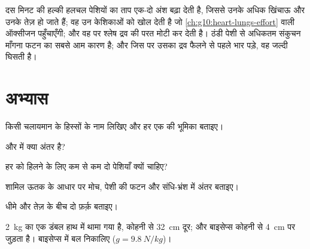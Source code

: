 \begin{remark}\label{rem:g10:muscles-and-joints:warmup}
दस मिनट की हल्की हलचल पेशियों का ताप एक-दो अंश बढ़ा देती है, जिससे उनके
 अधिक खिंचाऊ और उनके  तेज़ हो जाते हैं; वह उन केशिकाओं को
खोल देती है जो \cref{ch:g10:heart-lungs-effort} वाली ऑक्सीजन पहुँचाएँगी;
और वह  पर श्लेष द्रव की परत मोटी कर देती है। ठंडी पेशी से अधिकतम
संकुचन माँगना फटन का सबसे आम कारण है; और जिस  पर उसका द्रव फैलने से
पहले भार पड़े, वह जल्दी घिसती है।
\end{remark}

\section{अभ्यास}

\begin{exercise}[$\star$]\label{exo:g10:muscles-and-joints:1}
किसी चलायमान  के हिस्सों के नाम लिखिए और हर एक की भूमिका बताइए।
\end{exercise}

\begin{exercise}[$\star$]\label{exo:g10:muscles-and-joints:2}
 और  में क्या अंतर है?
\end{exercise}

\begin{exercise}[$\star$]\label{exo:g10:muscles-and-joints:3}
हर  को हिलने के लिए कम से कम दो पेशियाँ क्यों चाहिए?
\end{exercise}

\begin{exercise}[$\star$]\label{exo:g10:muscles-and-joints:4}
शामिल ऊतक के आधार पर मोच, पेशी की फटन और संधि-भ्रंश में अंतर बताइए।
\end{exercise}

\begin{exercise}[$\star$]\label{exo:g10:muscles-and-joints:5}
धीमे और तेज़  के बीच दो फ़र्क़ बताइए।
\end{exercise}

\begin{exercise}[$\star\star$]\label{exo:g10:muscles-and-joints:6}
\qty{2}{kg} का एक डंबल हाथ में थामा गया है, कोहनी से \qty{32}{cm} दूर;
और बाइसेप्स कोहनी से \qty{4}{cm} पर जुड़ता है। बाइसेप्स में बल निकालिए
($g = \qty{9.8}{N/kg}$)।
\end{exercise}

